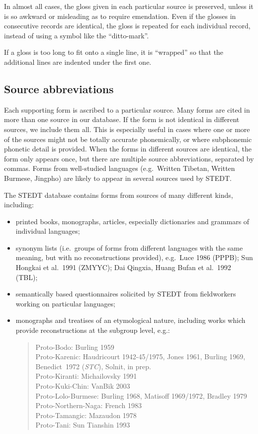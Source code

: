 In almost all cases, the gloss given in each particular source is preserved,
unless it is so awkward or misleading as to require emendation.  Even if the
glosses in consecutive records are identical, the gloss is repeated for each
individual record, instead of using a symbol like the “ditto-mark”.  


If a gloss is too long to fit onto a single line, it is “wrapped” so that
the additional lines are indented under the first one.

\subsection{Source abbreviations}


Each supporting form is ascribed to a particular source.  Many forms are
cited in more than one source in our database.  If the form is not identical in
different sources, we include them all.  This is especially useful in cases
where one or more of the sources might not be totally accurate phonemically, or
where subphonemic phonetic detail is provided. When the forms in different
sources are identical, the form only appears once, but there are multiple source
abbreviations, separated by commas.  Forms from well-studied languages
(e.g.\ Written Tibetan, Written Burmese, Jingpho) are likely to appear in several
sources used by STEDT.


The STEDT database contains forms from sources of many different kinds,
including:
\begin{itemize}
\item printed books, monographs, articles, especially dictionaries and grammars of
individual languages;
\item synonym lists (i.e.\ groups of forms from different languages with the same
meaning, but with no reconstructions provided), e.g.\ Luce 1986 (PPPB); Sun
Hongkai et al.\ 1991 (ZMYYC); Dai Qingxia, Huang Bufan et al.\ 1992 (TBL);
\item semantically based questionnaires solicited by STEDT from fieldworkers working
on particular languages;
\item monographs and treatises of an etymological nature, including works which
provide reconstructions at the subgroup level, e.g.:

\begin{verse}
Proto-Bodo: Burling 1959\\
Proto-Karenic: Haudricourt 1942-45/1975, Jones 1961, Burling 1969, Benedict~1972 (\textit{STC}), Solnit, in prep.\\
Proto-Kiranti: Michailovsky 1991\\
Proto-Kuki-Chin: VanBik 2003\\
Proto-Lolo-Burmese: Burling 1968, Matisoff 1969/1972, Bradley 1979\\
Proto-Northern-Naga: French 1983\\
Proto-Tamangic: Mazaudon 1978\\
Proto-Tani: Sun Tianshin 1993\\
\end{verse}
\end{itemize}



